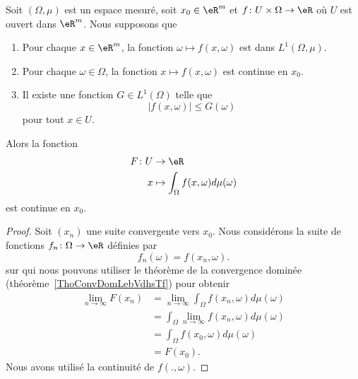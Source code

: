 \begin{theorem} \label{ThoKnuSNd}
	Soit \( (\Omega,\mu)\) est un espace mesuré, soit \( x_0\in \eR^m\) et \( f\colon U\times \Omega\to \eR\) où \( U\) est ouvert dans \( \eR^m\). Nous supposons que
	\begin{enumerate}
		\item
		      Pour chaque \( x\in \eR^m\), la fonction \( \omega\mapsto f(x,\omega)\) est dans \( L^1(\Omega,\mu)\).
		\item
		      Pour chaque \( \omega\in \Omega\), la fonction \( x\mapsto f(x,\omega)\) est continue en \( x_0\).
		\item       \label{ItemNAuYNG}
		      Il existe une fonction \( G\in L^1(\Omega)\) telle que
		      \begin{equation}
			      | f(x,\omega) |\leq G(\omega)
		      \end{equation}
		      pour tout \( x\in U\).
	\end{enumerate}
	Alors la fonction
	\begin{equation}
		\begin{aligned}
			F\colon U & \to \eR                                      \\
			x         & \mapsto \int_{\Omega}f(x,\omega)d\mu(\omega)
		\end{aligned}
	\end{equation}
	est continue en \( x_0\).
\end{theorem}


\begin{proof}
	Soit \( (x_n)\) une suite convergente vers \( x_0\). Nous considérons la suite de fonctions \( f_n\colon \Omega\to \eR\) définies par
	\begin{equation}
		f_n(\omega)=f(x_n,\omega).
	\end{equation}
	sur qui nous pouvons utiliser le théorème de la convergence dominée (théorème~\ref{ThoConvDomLebVdhsTf}) pour obtenir
	\begin{subequations}
		\begin{align}
			\lim_{n\to \infty} F(x_n) & =\lim_{n\to \infty} \int_{\Omega}f(x_n,\omega)d\mu(\omega) \\
			                          & =\int_{\Omega}\lim_{n\to \infty} f(x_n,\omega)d\mu(\omega) \\
			                          & =\int_{\Omega}f(x_0,\omega)d\mu(\omega)                    \\
			                          & =F(x_0).
		\end{align}
	\end{subequations}
	Nous avons utilisé la continuité de \( f(.,\omega)\).
\end{proof}

